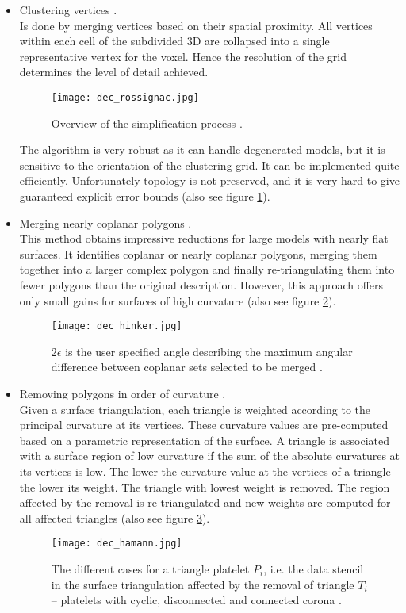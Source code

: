 \begin{itemize}
    \item Clustering vertices \citep[cf.][]{Rossignac1993}.\\
Is done by merging vertices based on their spatial proximity. All vertices within each cell of the subdivided 3D are collapsed into a single representative vertex for the voxel. Hence the resolution of the grid determines the level of detail achieved.
\begin{figure}[ht]
\centering
\texttt{[image: dec\_rossignac.jpg]}
\caption{Overview of the simplification process \citep[][p.458]{Rossignac1993}.}
\label{fig:dec_rossignac}
\end{figure}
The algorithm is very robust as it can handle degenerated models, but it is sensitive to the orientation of the clustering grid. It can be implemented quite efficiently. Unfortunately topology is not preserved, and it is very hard to give guaranteed explicit error bounds (also see figure \ref{fig:dec_rossignac}).

    \item Merging nearly coplanar polygons \citep[cf.][]{Hinker1993}.\\
This method obtains impressive reductions for large models with nearly flat surfaces. It identifies coplanar or nearly coplanar polygons, merging them together into a larger complex polygon and finally re-triangulating them into fewer polygons than the original description. However, this approach offers only small gains
for surfaces of high curvature (also see figure \ref{fig:dec_hinker}).
\begin{figure}[ht]
\centering
\texttt{[image: dec\_hinker.jpg]}
\caption{
$2\epsilon$ is the user specified angle describing the maximum angular difference between coplanar sets selected to be merged \citep[][p.192]{Hinker1993}.}
\label{fig:dec_hinker}
\end{figure}

    \item Removing polygons in order of curvature \citep[cf.][]{Hamann1994}.\\
Given a surface triangulation, each triangle is weighted according to the principal curvature at its vertices.
These curvature values are pre-computed based on a parametric representation of the surface.
A triangle is associated with a surface region of low curvature if the sum of the absolute curvatures at its vertices is low.
The lower the curvature value at the vertices of a triangle the lower its weight.
The triangle with lowest weight is removed.
The region affected by the removal is re-triangulated and new weights are computed for all affected triangles (also see figure \ref{fig:dec_hamann}).
\begin{figure}[ht]
\centering
\texttt{[image: dec\_hamann.jpg]}
\caption{The different cases for a triangle platelet $P_{i}$, i.e. the data stencil in the surface triangulation affected by the removal of triangle $T_{i}$ --  platelets with cyclic, disconnected and connected corona \citep[][p.200]{Hamann1994}.}
\label{fig:dec_hamann}
\end{figure}


\end{itemize}
